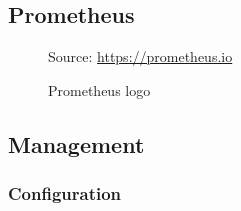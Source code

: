 \subsection{Prometheus}
\label{subsec:implementation_dependencies_prometheus}

\begin{figure} %
  \centering
  \def\stackalignment{r} %
  {\scriptsize \parbox[t]{\linewidth}{ Source: \url{https://prometheus.io}} }
  \caption{Prometheus logo}
\end{figure}

\subsection{Management}
\label{subsec:implementation_dependencies_management}

\subsubsection{Configuration}
\label{subsec:implementation_dependencies_management_configuration}

